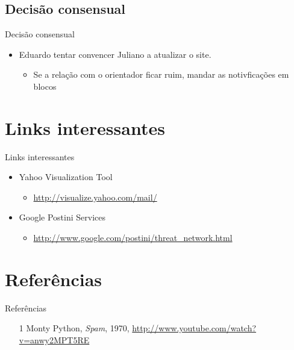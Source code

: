 \documentclass[dvipdfm]{beamer}
\begin{document}
\subsection{Decisão consensual}
\begin{frame}{Decisão consensual}
	\begin{itemize}
		\item Eduardo tentar convencer Juliano a atualizar o site.
		\begin{itemize}
			\item Se a relação com o orientador ficar ruim, mandar as notivficações em blocos
		\end{itemize}
	\end{itemize}
\end{frame}


\section{Links interessantes}
\begin{frame}{Links interessantes}

	\begin{itemize}
		\item Yahoo Visualization Tool
		\begin{itemize}
			\item \url{http://visualize.yahoo.com/mail/}
		\end{itemize}
		\item Google Postini Services
		\begin{itemize}
			\item \url{http://www.google.com/postini/threat_network.html}
		\end{itemize}
	\end{itemize}

\end{frame}

\section{Referências}
\begin{frame}{Referências}
	\begin{itemize}
		\item [1] Monty Python, \emph{Spam}, 1970, \url{http://www.youtube.com/watch?v=anwy2MPT5RE} 
	\end{itemize}
\end{frame}
\end{document}
